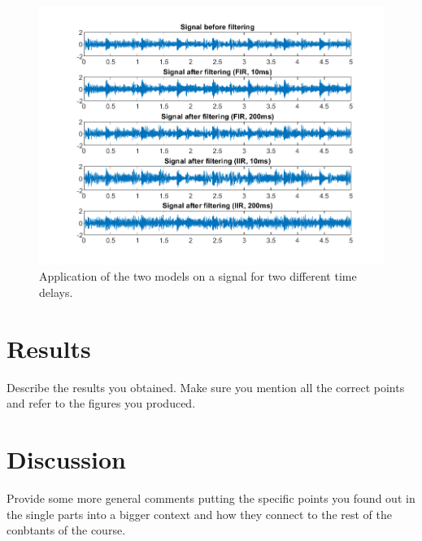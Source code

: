 \documentclass[journal]{IEEEtran}
\begin{document}
\begin{figure}
    \centering
    \includegraphics[width=\linewidth]{assignment_01/plots/bounce_signals.png}
    \caption{Application of the two models on a signal for two different time delays.}
    \label{fig:bounce:signals}
\end{figure}

\clearpage
\newpage

\section{Results}
Describe the results you obtained. Make sure you mention all the correct points and refer to the figures you produced.

\section{Discussion}
Provide some more general comments putting the specific points you found out in the single parts into a bigger context and how they connect to the rest of the conbtants of the course.



\clearpage
\end{document}
